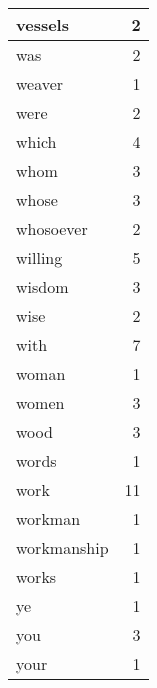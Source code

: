 \begin{center}
\begin{longtable}{l|r}
vessels & 2 \\ \hline
was & 2 \\ \hline
weaver & 1 \\ \hline
were & 2 \\ \hline
which & 4 \\ \hline
whom & 3 \\ \hline
whose & 3 \\ \hline
whosoever & 2 \\ \hline
willing & 5 \\ \hline
wisdom & 3 \\ \hline
wise & 2 \\ \hline
with & 7 \\ \hline
woman & 1 \\ \hline
women & 3 \\ \hline
wood & 3 \\ \hline
words & 1 \\ \hline
work & 11 \\ \hline
workman & 1 \\ \hline
workmanship & 1 \\ \hline
works & 1 \\ \hline
ye & 1 \\ \hline
you & 3 \\ \hline
your & 1 \\ \hline
\end{longtable}
\end{center}



\normalsize



